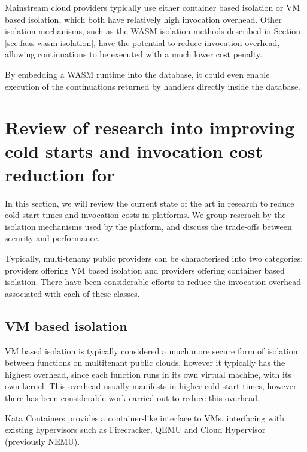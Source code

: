 Mainstream cloud providers typically use either container based isolation or VM based isolation, which both have relatively high invocation overhead. Other isolation mechanisms, such as the WASM isolation methods described in Section \ref{sec:faas-wasm-isolation}, have the potential to reduce invocation overhead, allowing continuations to be executed with a much lower cost penalty.

By embedding a WASM runtime into the database, it could even enable execution of the continuations returned by \faaasc{} handlers directly inside the database.

\section{Review of research into improving cold starts and invocation cost reduction for \faas{}}
\label{sec:faas-isolation}
In this section, we will review the current state of the art in research to reduce cold-start times and invocation costs in \faas{} platforms. We group reserach by the isolation mechanisms used by the \faas{} platform, and discuss the trade-offs between security and performance.

Typically, multi-tenany public \faas{} providers can be characterised into two categories: providers offering VM based isolation\cite{agacheFirecrackerLightweightVirtualization2020} and providers offering container based isolation\cite{GVisor}. There have been considerable efforts to reduce the invocation overhead associated with each of these classes.

\subsection{VM based isolation}
VM based isolation is typically considered a much more secure form of isolation between \faas{} functions on multitenant public clouds\cite{jithinVirtualMachineIsolation2014}, however it typically has the highest overhead, since each function runs in its own virtual machine, with its own kernel. This overhead usually manifests in higher cold start times, however there has been considerable work carried out to reduce this overhead\cite{razaviPrebakedUVMsScalable2015,agacheFirecrackerLightweightVirtualization2020,dawXanaduMitigatingCascading2020,oliverstenbomRefunctionEliminatingServerless2019}.

Kata Containers\cite{KataContainersOpen} provides a container-like interface to VMs, interfacing with existing hypervisors such as Firecracker\cite{agacheFirecrackerLightweightVirtualization2020}, QEMU\cite{QEMU} and Cloud Hypervisor\cite{CloudhypervisorCloudhypervisorVirtual} (previously NEMU\cite{IntelNemu2024}).


